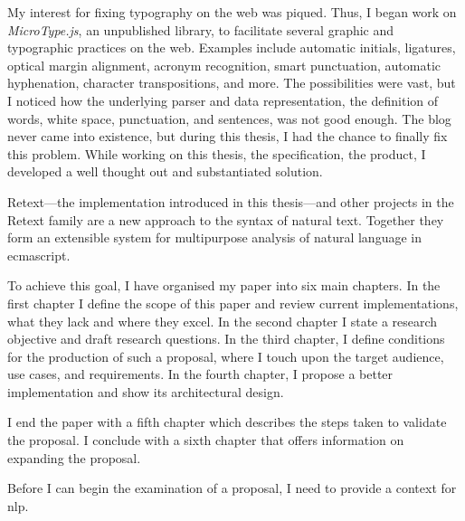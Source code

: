 My interest for fixing typography on the web was piqued.
Thus, I began work on \emph{MicroType.js}, an unpublished library, to
  facilitate several graphic and typographic practices on the web.
Examples include automatic initials, ligatures, optical margin alignment,
  acronym recognition, smart punctuation, automatic hyphenation, character
  transpositions, and more.
The possibilities were vast, but I noticed how the underlying parser and data
  representation, the definition of words, white space, punctuation, and
  sentences, was not good enough.
The blog never came into existence, but during this thesis, I had the chance
  to finally fix this problem.
While working on this thesis, the specification, the product, I developed a
  well thought out and substantiated solution.

Retext---the implementation introduced in this thesis---and other projects
  in the Retext family are a new approach to the syntax of natural text.
Together they form an extensible system for multipurpose analysis of natural
  language in \gls{ecmascript}.

To achieve this goal, I have organised my paper into six main chapters.
In the first chapter I define the scope of this paper and review current
  implementations, what they lack and where they excel.
In the second chapter I state a research objective and draft research
  questions.
In the third chapter, I define conditions for the production of such a
  proposal, where I touch upon the target audience, use cases, and
  requirements.
In the fourth chapter, I propose a better implementation and show its
  architectural design.

I end the paper with a fifth chapter which describes the steps taken to
  validate the proposal.
I conclude with a sixth chapter that offers information on expanding the
  proposal.

Before I can begin the examination of a proposal, I need to provide a
  context for \gls{nlp}.

\endgroup
